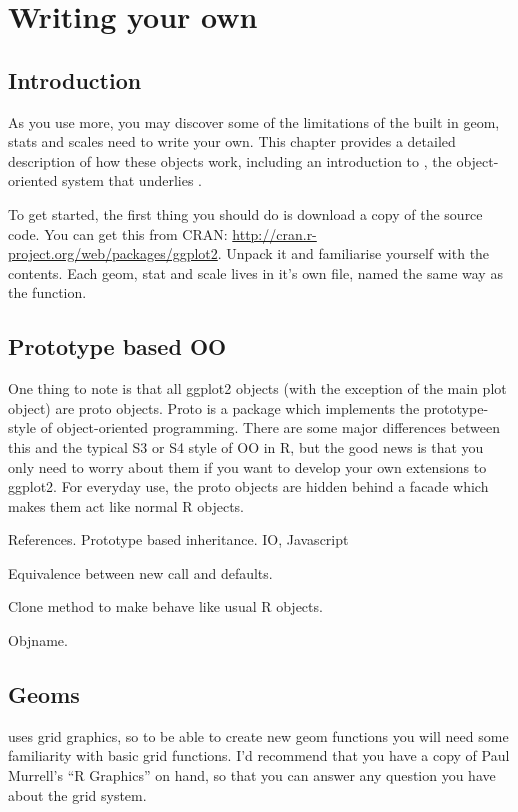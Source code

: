 

\chapter{Writing your own}

\section{Introduction}

As you use \ggplot more, you may discover some of the limitations of the built in geom, stats and scales need to write your own.  This chapter provides a detailed description of how these objects work, including an introduction to , the object-oriented system that underlies \ggplot.

To get started, the first thing you should do is download a copy of the source code.  You can get this from CRAN: \url{http://cran.r-project.org/web/packages/ggplot2}.  Unpack it and familiarise yourself with the contents.  Each geom, stat and scale lives in it's own file, named the same way as the function.  

\section{Prototype based OO} %
\label{sec:proto}

One thing to note is that all ggplot2 objects (with the exception of the main plot object) are proto objects.  Proto is a package which implements the prototype-style of object-oriented programming.  There are some major differences between this and the typical S3 or S4 style of OO in R, but the good news is that you only need to worry about them if you want to develop your own extensions to ggplot2.  For everyday use, the proto objects are hidden behind a facade which makes them act like normal R objects.


References.
Prototype based inheritance.  IO, Javascript

Equivalence between new call and defaults.

Clone method to make behave like usual R objects.

Objname.

\section{Geoms}
\label{sec:own-geom}

\ggplot uses grid graphics, so to be able to create new geom functions you will need some familiarity with basic grid functions.  I'd recommend that you have a copy of Paul Murrell's ``R Graphics'' on hand, so that you can answer any question you have about the grid system.

